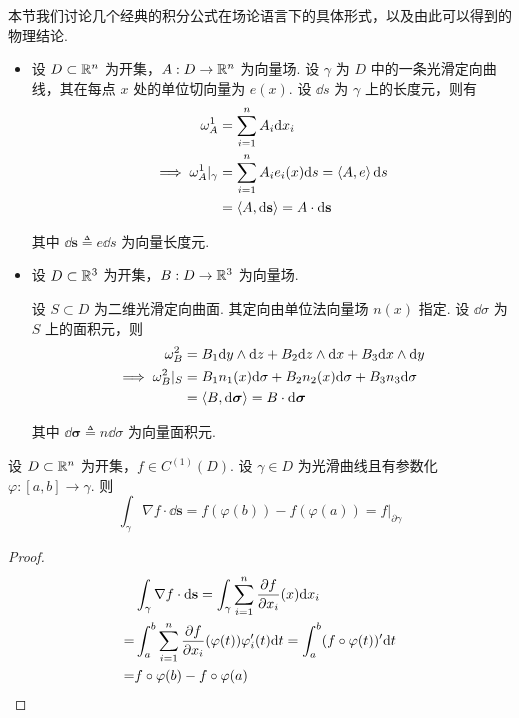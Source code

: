 本节我们讨论几个经典的积分公式在场论语言下的具体形式，以及由此可以得到的物理结论.



\begin{itemize}
    \item 设 $D\subset\mathbb{R}^n$ 为开集，$A:D\to\mathbb{R}^n$ 为向量场. 设 $\gamma$ 为 $D$ 中的一条光滑定向曲线，其在每点 $x$ 处的单位切向量为 $e(x)$. 设 $\dd s$ 为 $\gamma$ 上的长度元，则有
$$
\begin{aligned}
    \omega_A^1&=\sum_{i=1}^nA_i\mathrm{d} x_i\\
    \implies\omega_A^1|_\gamma&=\sum_{i=1}^nA_ie_i(x)\mathrm{d} s=\left\langle{A,e}\right\rangle\mathrm{d} s\\
    &=\left\langle{A,\mathrm{d}\mathbf{s}}\right\rangle=A\cdot\mathrm{d}\mathbf{s}
\end{aligned}
$$
    
    其中 $\dd\mathbf{s}\triangleq e\dd s$ 为向量长度元.

    \item 设 $D\subset\mathbb{R}^3$ 为开集，$B:D\to\mathbb{R}^3$ 为向量场.
    
    设 $S\subset D$ 为二维光滑定向曲面. 其定向由单位法向量场 $n(x)$ 指定. 设 $\dd\sigma$ 为 $S$ 上的面积元，则
$$
\begin{aligned}
    \omega_B^2&=B_1\mathrm{d} y\wedge\mathrm{d} z+B_2\mathrm{d} z\wedge\mathrm{d} x+B_3\mathrm{d} x\wedge\mathrm{d} y\\
    \implies\omega_B^2|_S&=B_1n_1(x)\mathrm{d}\sigma+B_2n_2(x)\mathrm{d}\sigma+B_3n_3\mathrm{d}\sigma\\
    &=\left\langle{B,\mathrm{d}\bm{\sigma}}\right\rangle=B\cdot\mathrm{d}\bm{\sigma}
\end{aligned}
$$

    其中 $\dd\bm{\sigma}\triangleq n\dd\sigma$ 为向量面积元.
\end{itemize}


\begin{theorem}  
    设 $D\subset\mathbb{R}^n$ 为开集，$f\in C^{(1)}(D)$. 设 $\gamma\in D$ 为光滑曲线且有参数化 $\varphi:[a,b]\to\gamma$. 则
$$
\int_\gamma\nabla f\cdot\dd\mathbf{s}=f(\varphi(b))-f(\varphi(a))=f\biggr |_{\partial\gamma}
$$
\end{theorem}
\begin{proof}
$$
\begin{aligned}
    &\int_\gamma\nabla f\cdot\mathrm{d}\mathbf{s}=\int_\gamma\sum_{i=1}^n\frac{\partial{f}}{\partial{x_i}}(x)\mathrm{d} x_i\\
    =&\int_a^b\sum_{i=1}^n\frac{\partial{f}}{\partial{x_i}}(\varphi(t))\varphi_i'(t)\mathrm{d} t=\int_a^b(f\circ\varphi(t))'\mathrm{d} t\\
    =&f\circ\varphi(b)-f\circ\varphi(a)
\end{aligned}
$$
\end{proof}

